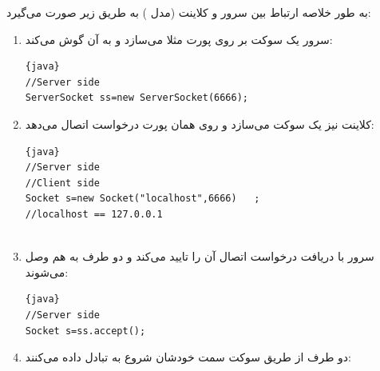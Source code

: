 \documentclass[]{article}
\begin{document}
\href{https://www.baeldung.com/udp-in-java}{\textcolor{blue}{\underline{}}}

\href{TCP vs UDP - Difference and Comparison}{\textcolor{blue}{\underline{}}}


به طور خلاصه ارتباط بین سرور و کلاینت (مدل ) به طریق زیر صورت می‌گیرد:

\begin{enumerate}

\item
سرور یک سوکت بر روی پورت مثلا  می‌سازد و به آن گوش می‌کند:

\begin{latin}

\begin{lstlisting}{java}
//Server side
ServerSocket ss=new ServerSocket(6666);  

\end{lstlisting}

\end{latin}

\item
کلاینت نیز یک سوکت می‌سازد و روی همان پورت درخواست اتصال می‌دهد:

\begin{latin}

\begin{lstlisting}{java}
//Server side
//Client side
Socket s=new Socket("localhost",6666)	;
//localhost == 127.0.0.1
 

\end{lstlisting}

\end{latin}

\item
سرور با دریافت درخواست اتصال آن‌ را تایید می‌کند و دو طرف به هم وصل می‌شوند:


\begin{latin}

\begin{lstlisting}{java}
//Server side
Socket s=ss.accept();

\end{lstlisting}

\end{latin}

\item
دو طرف از طریق سوکت سمت خودشان شروع به تبادل داده می‌کنند:


\begin{latin}


\end{latin}
\end{enumerate}
\end{document}

